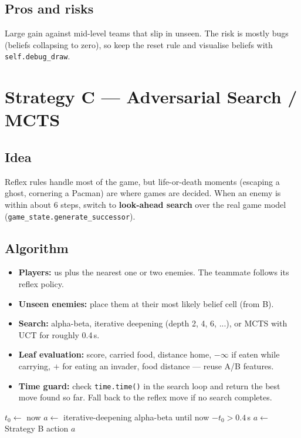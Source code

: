 \documentclass[11pt,a4paper]{article}
\begin{document}
\subsection{Pros and risks}
Large gain against mid-level teams that slip in unseen. The risk is mostly bugs (beliefs collapsing to
zero), so keep the reset rule and visualise beliefs with \texttt{self.debug\_draw}.

\section{Strategy C --- Adversarial Search / MCTS}

\subsection{Idea}
Reflex rules handle most of the game, but life-or-death moments (escaping a ghost, cornering a Pacman)
are where games are decided. When an enemy is within about 6 steps, switch to \textbf{look-ahead search}
over the real game model (\texttt{game\_state.generate\_successor}).

\subsection{Algorithm}
\begin{itemize}
  \item \textbf{Players:} us plus the nearest one or two enemies. The teammate follows its reflex policy.
  \item \textbf{Unseen enemies:} place them at their most likely belief cell (from B).
  \item \textbf{Search:} alpha-beta, iterative deepening (depth 2, 4, 6, ...), or MCTS with UCT for
        roughly 0.4\,s.
  \item \textbf{Leaf evaluation:} score, carried food, distance home, $-\infty$ if eaten while carrying,
        $+$ for eating an invader, food distance --- reuse A/B features.
  \item \textbf{Time guard:} check \texttt{time.time()} in the search loop and return the best move found
        so far. Fall back to the reflex move if no search completes.
\end{itemize}

\begin{algorithm}[H]
\caption{Hybrid controller}
\begin{algorithmic}[1]
\State $t_0 \gets$ now
  \State $a \gets$ iterative-deepening alpha-beta until now $- t_0 > 0.4$\,s
\Else
  \State $a \gets$ Strategy B action
\EndIf
\State \Return $a$
\end{algorithmic}
\end{algorithm}
\end{document}

